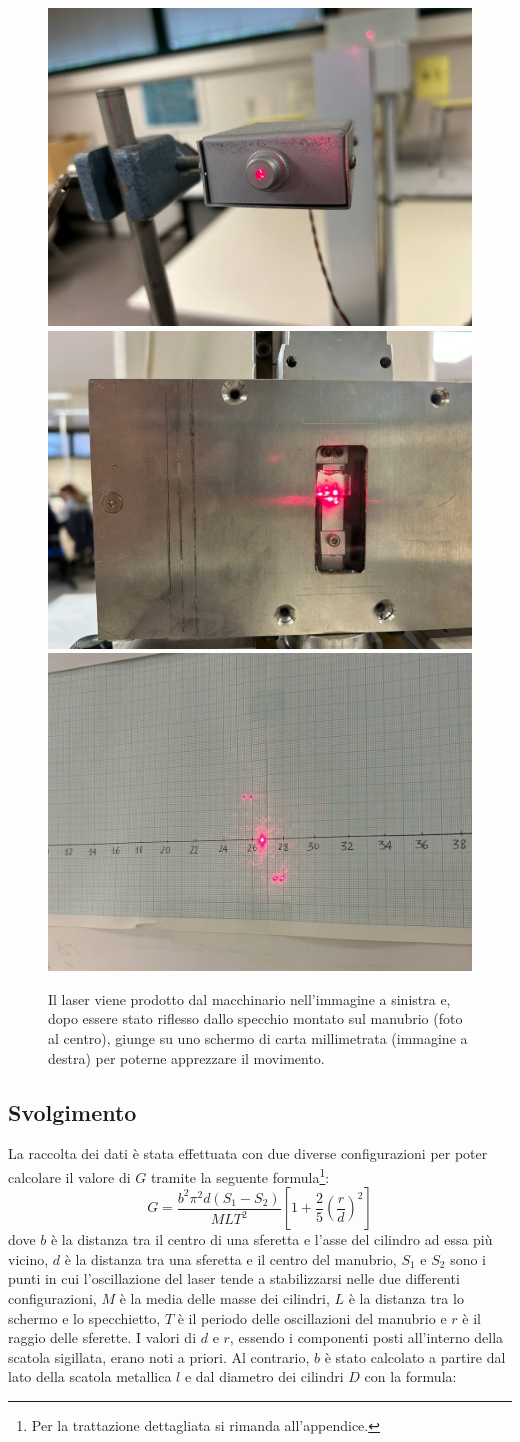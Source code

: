 \documentclass{article}
\begin{document}
\begin{figure}[ht!]
    \centering
    \includegraphics[width=0.3\linewidth]{images/laser.jpg}
    \hfill
    \includegraphics[width=0.3\linewidth]{images/mirror.jpg}
    \hfill
    \includegraphics[width=0.3\linewidth]{images/monitor.jpg}
    \caption{Il laser viene prodotto dal macchinario nell'immagine a sinistra e, dopo essere stato riflesso dallo specchio montato sul manubrio (foto al centro), giunge su uno schermo di carta millimetrata (immagine a destra) per poterne apprezzare il movimento.}
    \label{fig:laser}
\end{figure}

\subsection{Svolgimento}
La raccolta dei dati è stata effettuata con due diverse configurazioni per poter calcolare il valore di $G$ tramite la seguente formula\footnote{Per la trattazione dettagliata si rimanda all'appendice.}:
\begin{equation}\label{eq:g}
    G = \frac{b ^ 2 \pi ^ 2 d (S_1 - S_2)}{M L T ^ 2} \left[1 + \frac{2}{5} \left(\frac{r}{d}\right) ^ 2\right]
\end{equation}
dove $b$ è la distanza tra il centro di una sferetta e l'asse del cilindro ad essa più vicino, $d$ è la distanza tra una sferetta e il centro del manubrio, $S_1$ e $S_2$ sono i punti in cui l'oscillazione del laser tende a stabilizzarsi nelle due differenti configurazioni, $M$ è la media delle masse dei cilindri, $L$ è la distanza tra lo schermo e lo specchietto, $T$ è il periodo delle oscillazioni del manubrio e $r$ è il raggio delle sferette. I valori di $d$ e $r$, essendo i componenti posti all'interno della scatola sigillata, erano noti a priori. Al contrario, $b$ è stato calcolato a partire dal lato della scatola metallica $l$ e dal diametro dei cilindri $D$ con la formula:
\end{document}
